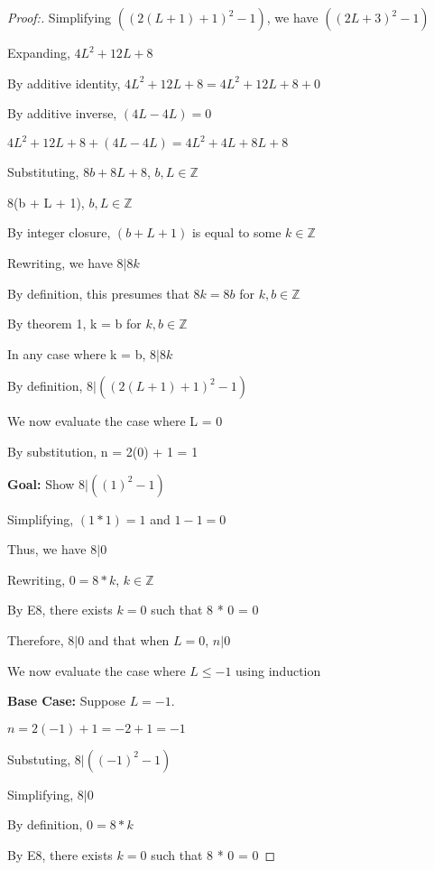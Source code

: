 \documentclass[12pt]{article}
\begin{document}
\begin{proof}[Proof:]
    Simplifying $((2(L + 1) + 1)^2 - 1)$, we have $((2L + 3)^2 - 1)$

    Expanding, $4L^2 + 12L + 8$

    By additive identity, $4L^2 + 12L + 8 = 4L^2 + 12L + 8 + 0$

    By additive inverse, $(4L - 4L) = 0$

    $4L^2 + 12L + 8 + (4L - 4L) = 4L^2 + 4L + 8L + 8$

    Substituting, $8b + 8L + 8$, $b, L \in \mathbb{Z}$

    8(b + L + 1), $b, L \in \mathbb{Z}$

    By integer closure, $(b + L + 1)$ is equal to some $ k \in \mathbb{Z}$

    Rewriting, we have $8 | 8k$

    By definition, this presumes that $8k = 8b$ for $k, b \in \mathbb{Z}$

    By theorem 1, k = b for $k, b \in \mathbb{Z}$

    In any case where k = b, $8 | 8k$

    By definition, $8 | ((2(L + 1) + 1)^2 - 1)$

    \medskip

    We now evaluate the case where L = 0

    By substitution, n = 2(0) + 1 = 1

    \textbf{Goal:} Show $8 | ((1)^2 - 1)$

    Simplifying, $(1 * 1) = 1$ and $1 - 1 = 0$

    Thus, we have $8 | 0$

    Rewriting, $0 = 8 * k$, $k \in \mathbb{Z}$

    By E8, there exists $k = 0$ such that 8 * 0 = 0

    Therefore, $8 | 0$ and that when $L = 0$, $n | 0$

    \medskip

    We now evaluate the case where $L \leq -1$ using induction

    \medskip

    \textbf{Base Case:} Suppose $L = -1$. 
    
    $n = 2(-1) + 1 = -2 + 1 = -1$
    
    Substuting, $8 | ((-1)^2 - 1)$

    Simplifying, $8 | 0$

    By definition, $0 = 8 * k$

    By E8, there exists $k = 0$ such that 8 * 0 = 0


\end{proof}
\end{document}
